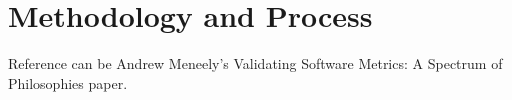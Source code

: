 \section{Methodology and Process} \label{sec:process}

Reference can be Andrew Meneely's Validating Software Metrics: A Spectrum of Philosophies paper.